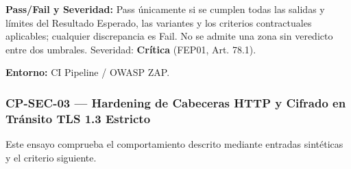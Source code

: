 \par\noindent\textbf{Pass/Fail y Severidad:} Pass únicamente si se cumplen todas las salidas y límites del Resultado Esperado, las variantes y los criterios contractuales aplicables; cualquier discrepancia es Fail. No se admite una zona sin veredicto entre dos umbrales. Severidad: \textbf{Crítica} (FEP01, Art. 78.1).\par
\par\noindent\textbf{Entorno:} CI Pipeline / OWASP ZAP.\par






\subsubsection*{CP-SEC-03 — Hardening de Cabeceras HTTP y Cifrado en Tránsito TLS 1.3 Estricto}\label{sec:9-cp-sec-03}
Este ensayo comprueba el comportamiento descrito mediante entradas sintéticas y el criterio siguiente.


